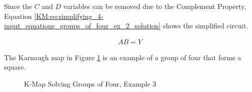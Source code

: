 Since the $ C $ and $ D $ variables can be removed due to the Complement Property, Equation \ref{KM:eq:simplifying_4-input_equations_groups_of_four_ex_2_solution} shows the simplified circuit. 

\begin{align}
  \label{KM:eq:simplifying_4-input_equations_groups_of_four_ex_2_solution}
  AB = Y
\end{align}

The Karnaugh map in Figure \ref{KM:fig:kmap_solving_groups_of_four_ex_3} is an example of a group of four that forms a square.

\begin{figure}[H]
  \caption{K-Map Solving Groups of Four, Example 3}
  \label{KM:fig:kmap_solving_groups_of_four_ex_3}
  \myfloatalign
\end{figure}
